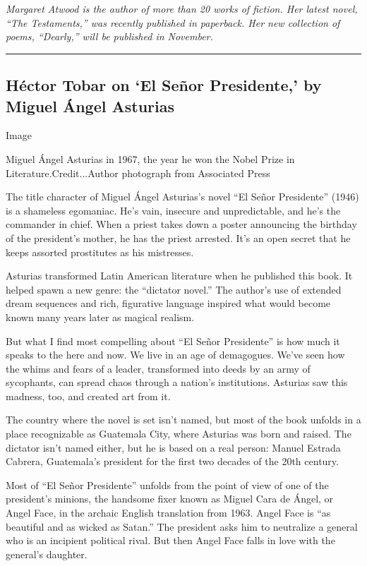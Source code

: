 \emph{Margaret Atwood is the author of more than 20 works of fiction.
Her latest novel, ``The Testaments,'' was recently published in
paperback. Her new collection of poems, ``Dearly,'' will be published in
November.}

\begin{center}\rule{0.5\linewidth}{\linethickness}\end{center}

\hypertarget{huxe9ctor-tobar-on-el-seuxf1or-presidente-by-miguel-uxe1ngel-asturias}{%
\subsection{Héctor Tobar on `El Señor Presidente,' by Miguel Ángel
Asturias}\label{huxe9ctor-tobar-on-el-seuxf1or-presidente-by-miguel-uxe1ngel-asturias}}

Image

Miguel Ángel Asturias in 1967, the year he won the Nobel Prize in
Literature.Credit...Author photograph from Associated Press

The title character of Miguel Ángel Asturias's novel ``El Señor
Presidente'' (1946) is a shameless egomaniac. He's vain, insecure and
unpredictable, and he's the commander in chief. When a priest takes down
a poster announcing the birthday of the president's mother, he has the
priest arrested. It's an open secret that he keeps assorted prostitutes
as his mistresses.

Asturias transformed Latin American literature when he published this
book. It helped spawn a new genre: the ``dictator novel.'' The author's
use of extended dream sequences and rich, figurative language inspired
what would become known many years later as magical realism.

But what I find most compelling about ``El Señor Presidente'' is how
much it speaks to the here and now. We live in an age of demagogues.
We've seen how the whims and fears of a leader, transformed into deeds
by an army of sycophants, can spread chaos through a nation's
institutions. Asturias saw this madness, too, and created art from it.

The country where the novel is set isn't named, but most of the book
unfolds in a place recognizable as Guatemala City, where Asturias was
born and raised. The dictator isn't named either, but he is based on a
real person: Manuel Estrada Cabrera, Guatemala's president for the first
two decades of the 20th century.

Most of ``El Señor Presidente'' unfolds from the point of view of one of
the president's minions, the handsome fixer known as Miguel Cara de
Ángel, or Angel Face, in the archaic English translation from 1963.
Angel Face is ``as beautiful and as wicked as Satan.'' The president
asks him to neutralize a general who is an incipient political rival.
But then Angel Face falls in love with the general's daughter.

